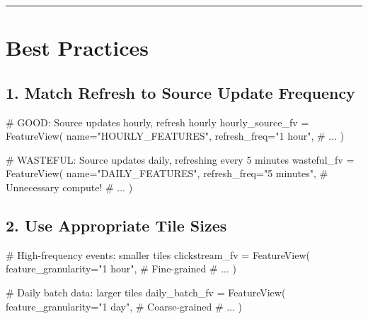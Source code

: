 \documentclass[
  letterpaper,
  DIV=11,
  numbers=noendperiod]{scrreprt}
\newenvironment{Shaded}{\begin{snugshade}}{\end{snugshade}}
\newcommand{\CommentTok}[1]{\textcolor[rgb]{0.37,0.37,0.37}{#1}}
\newcommand{\NormalTok}[1]{\textcolor[rgb]{0.00,0.23,0.31}{#1}}
\newcommand{\OperatorTok}[1]{\textcolor[rgb]{0.37,0.37,0.37}{#1}}
\newcommand{\StringTok}[1]{\textcolor[rgb]{0.13,0.47,0.30}{#1}}
\begin{document}
\begin{center}\rule{0.5\linewidth}{0.5pt}\end{center}

\hypertarget{best-practices-3}{%
\section{Best Practices}\label{best-practices-3}}

\hypertarget{match-refresh-to-source-update-frequency}{%
\subsection{1. Match Refresh to Source Update
Frequency}\label{match-refresh-to-source-update-frequency}}

\begin{Shaded}
\begin{Highlighting}[]
\CommentTok{\# GOOD: Source updates hourly, refresh hourly}
\NormalTok{hourly\_source\_fv }\OperatorTok{=}\NormalTok{ FeatureView(}
\NormalTok{    name}\OperatorTok{=}\StringTok{"HOURLY\_FEATURES"}\NormalTok{,}
\NormalTok{    refresh\_freq}\OperatorTok{=}\StringTok{"1 hour"}\NormalTok{,}
    \CommentTok{\# ...}
\NormalTok{)}

\CommentTok{\# WASTEFUL: Source updates daily, refreshing every 5 minutes}
\NormalTok{wasteful\_fv }\OperatorTok{=}\NormalTok{ FeatureView(}
\NormalTok{    name}\OperatorTok{=}\StringTok{"DAILY\_FEATURES"}\NormalTok{,}
\NormalTok{    refresh\_freq}\OperatorTok{=}\StringTok{"5 minutes"}\NormalTok{,  }\CommentTok{\# Unnecessary compute!}
    \CommentTok{\# ...}
\NormalTok{)}
\end{Highlighting}
\end{Shaded}

\hypertarget{use-appropriate-tile-sizes}{%
\subsection{2. Use Appropriate Tile
Sizes}\label{use-appropriate-tile-sizes}}

\begin{Shaded}
\begin{Highlighting}[]
\CommentTok{\# High{-}frequency events: smaller tiles}
\NormalTok{clickstream\_fv }\OperatorTok{=}\NormalTok{ FeatureView(}
\NormalTok{    feature\_granularity}\OperatorTok{=}\StringTok{"1 hour"}\NormalTok{,  }\CommentTok{\# Fine{-}grained}
    \CommentTok{\# ...}
\NormalTok{)}

\CommentTok{\# Daily batch data: larger tiles}
\NormalTok{daily\_batch\_fv }\OperatorTok{=}\NormalTok{ FeatureView(}
\NormalTok{    feature\_granularity}\OperatorTok{=}\StringTok{"1 day"}\NormalTok{,  }\CommentTok{\# Coarse{-}grained}
    \CommentTok{\# ...}
\NormalTok{)}
\end{Highlighting}
\end{Shaded}
\end{document}
